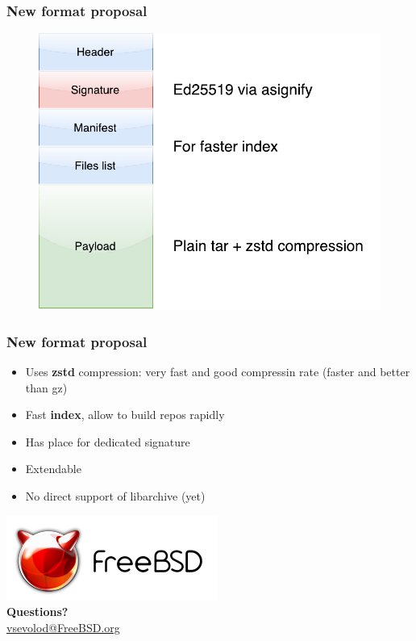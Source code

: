 \documentclass{beamer}
\begin{document}
\begin{frame}[fragile]
\frametitle{New format proposal}
\begin{figure}[h!]
  \centering
  \includegraphics[height=0.7\textheight]{pkg_new_format.pdf}
\end{figure}
\end{frame}

\begin{frame}
\frametitle{New format proposal}
\begin{itemize}
\item Uses \textbf{zstd} compression: very fast and good compressin rate (faster and better than gz)
\item<2-> Fast \textbf{index}, allow to build repos rapidly
\item<3-> Has place for dedicated signature
\item<4-> Extendable
\item<5-> No direct support of libarchive (yet)
\end{itemize}
\end{frame}

\begin{frame}
\begin{center}
\includegraphics{logo.pdf} \\
\textbf{Questions?} \\[4pt]
\url{vsevolod@FreeBSD.org}
\end{center}
\end{frame}
\end{document}
